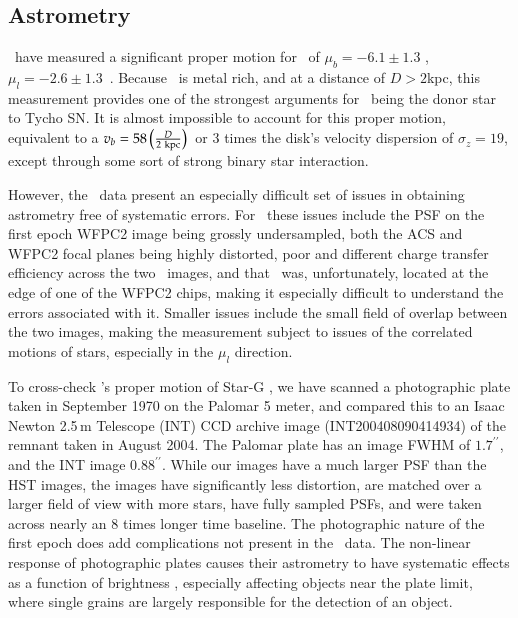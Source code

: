 \subsection{Astrometry}
\rl\ have measured a significant proper motion for \starg\ of $\mu_b=-6.1 \pm 1.3$ \masyr, $\mu_l=-2.6 \pm 1.3$\ \masyr. Because \starg\ is metal rich, and at a distance of $D>2$kpc, this measurement provides one of the strongest arguments for \starg\ being the donor star to Tycho SN. It is almost impossible to account for this proper motion, equivalent to a $v_b=58\left({{D}\over{2\rm{~kpc}}}\right)$\kms\ or 3 times the disk's velocity dispersion of $\sigma_z=19$\kms, except through some sort of strong binary star interaction.  

However, the \hst\ data present an especially difficult set of issues in obtaining astrometry free of systematic errors. For \starg\ these issues include the PSF on the first epoch WFPC2 image being grossly undersampled, both the ACS and WFPC2 focal planes being highly distorted,  poor and different charge transfer efficiency across the two \hst\ images, and that \starg\ was, unfortunately, located at the edge of one of the WFPC2 chips, making it especially difficult to understand the errors associated with it. Smaller issues include the small field of overlap between the two images, making the measurement subject to issues of the correlated motions of stars, especially in the $\mu_l$ direction.

To cross-check \rl's proper motion of Star-G , we have scanned a photographic plate taken in
September 1970 on the Palomar 5 meter, and compared this to an Isaac
Newton 2.5\,m Telescope (INT) CCD archive image (INT200408090414934) of the remnant taken in
August 2004. The Palomar plate has an image FWHM of $1.7^{\prime\prime}$, and the INT image $0.88^{\prime\prime}$. While our images have a much larger PSF than the HST images, the images have significantly less distortion, are matched over a larger field of view with more stars, have fully sampled PSFs, and were taken across nearly an 8 times longer time baseline. The photographic nature of the first epoch does add complications not present in the \hst\ data. The non-linear response of photographic plates causes their astrometry to have systematic effects as a function of brightness \citep{2001ASPC..232..311C}, especially affecting objects near the plate limit, where  single grains are largely responsible for the detection of an object. 


